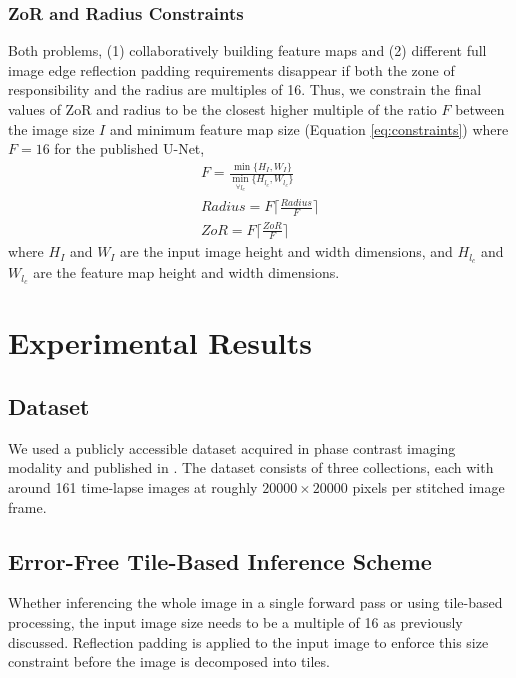 \documentclass[runningheads]{llncs}
\begin{document}
\subsubsection{ZoR and Radius Constraints}

Both problems, (1) collaboratively building feature maps and (2) different full image edge reflection padding requirements disappear if both the zone of responsibility and the radius are multiples of 16. Thus, we constrain the final values of ZoR and radius to be the closest higher multiple of the ratio $F$ between the image size $I$ and minimum feature map size (Equation \ref{eq:constraints}) where $F=16$ for the published U-Net, 
\begin{equation}
\begin{aligned}
F = \frac{ \min\{H_{I}, W_{I} \} }{ \min_{\forall l_{c}} \{ H_{l_{c}}, W_{l_{c}} \} } \\
Radius = F \lceil \frac{Radius}{F} \rceil \\
ZoR = F \lceil \frac{ZoR}{F} \rceil 
\end{aligned}
\label{eq:constraints}
\end{equation}
where $H_{I}$ and $W_{I}$ are the input image height and width dimensions, and $H_{l_{c}}$ and $W_{l_{c}}$ are the feature map height and width dimensions. 

\section{Experimental Results}
\label{experimental-results}

\subsection{Dataset}
\label{dataset}

We used a publicly accessible dataset acquired in phase contrast imaging modality and published in \cite{Bhadriraju2016}. 
The dataset consists of three collections, each with around 161 time-lapse images at roughly $\num{20000} \times \num{20000}$ pixels per stitched image frame. 


\subsection{Error-Free Tile-Based Inference Scheme}

Whether inferencing the whole image in a single forward pass or using tile-based processing, the input image size needs to be a multiple of 16 as previously discussed. Reflection padding is applied to the input image to enforce this size constraint before the image is decomposed into tiles. 
\end{document}
